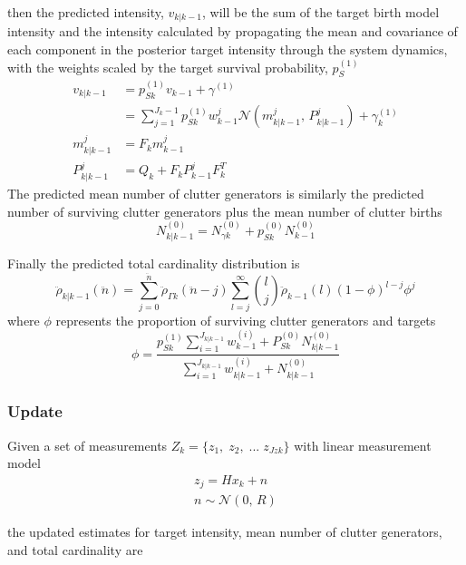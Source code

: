 \documentclass{article}
\newcommand{\tgt}{{(1)}}
\begin{document}
then the predicted intensity, $v_{k|k-1}$, will be the sum of the target birth model intensity and the intensity calculated by propagating the mean and covariance of each component in the posterior target intensity through the system dynamics, with the weights scaled by the target survival probability, $p_S^{(1)}$
\begin{align}
  \label{eq:v_predict}
  v_{k|k-1} &= p_{Sk}^{(1)}v_{k-1} + \gamma^{(1)}\\
           &= \sum_{j = 1}^{J_k-1} p^\tgt_{Sk}w_{k-1}^j \mathcal{N}(m_{k|k-1}^j,\,P_{k|k-1}^j) + \gamma^{(1)}_k\\
  m_{k|k-1}^j &= F_km_{k-1}^j\\
  P_{k|k-1}^j &= Q_k+F_kP_{k-1}^jF_k^T
\end{align}
The predicted mean number of clutter generators is similarly the predicted number of surviving clutter generators plus the mean number of clutter births
\begin{equation}
  \label{eq:N0_predict}
  N_{k|k-1}^{(0)} = N_{\gamma k}^{(0)} + p_{Sk}^{(0)}N_{k-1}^{(0)}
\end{equation}

Finally the predicted total cardinality distribution is
\begin{equation}
  \label{eq:rho_predict}
 \ddot{\rho}_{k|k-1}(\ddot{n}) = \sum_{j=0}^{\ddot{n}}\ddot{\rho}_{\Gamma k}(\ddot{n} - j) \sum_{l=j}^\infty {l \choose j}\ddot{\rho}_{k-1}(l)(1-\phi)^{l-j}\phi^j
\end{equation}
where $\phi$ represents the proportion of surviving clutter generators and targets
\begin{equation}
  \label{eq:phi}
  \phi = \frac{p_{Sk}^{(1)}\sum_{i=1}^{J_{k|k-1}}w_{k-1}^{(i)} + P_{Sk}^{(0)}N_{k|k-1}^{(0)}}{\sum_{i=1}^{J_{k|k-1}}w_{k|k-1}^{(i)} + N_{k|k-1}^{(0)}}
\end{equation}
\subsubsection{Update}
Given a set of measurements $Z_k = \{z_1,\;z_2,\;...\;z_{Jzk}\}$ with linear measurement model
\begin{align}
  \label{eq:z}
  z_j = Hx_k + n\\
  n\sim \mathcal{N}(0,\,R)
\end{align}

the updated estimates for target intensity, mean number of clutter generators, and total cardinality are
\end{document}
